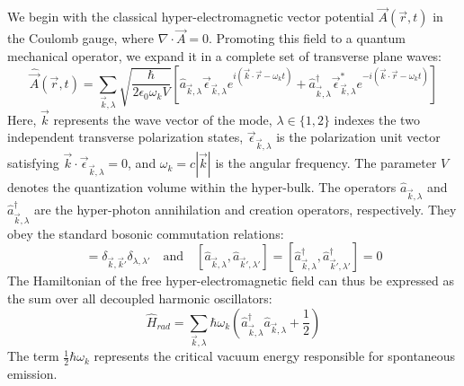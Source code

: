 We begin with the classical hyper-electromagnetic vector potential $\vec{A}(\vec{r}, t)$ in the Coulomb gauge, where $\nabla \cdot \vec{A} = 0$. Promoting this field to a quantum mechanical operator, we expand it in a complete set of transverse plane waves:
\begin{equation}
    \hat{\vec{A}}(\vec{r}, t) = \sum_{\vec{k}, \lambda} \sqrt{\frac{\hbar}{2 \epsilon_0 \omega_k V}} \left[ \hat{a}_{\vec{k}, \lambda} \vec{\epsilon}_{\vec{k}, \lambda} e^{i(\vec{k} \cdot \vec{r} - \omega_k t)} + \hat{a}_{\vec{k}, \lambda}^\dagger \vec{\epsilon}_{\vec{k}, \lambda}^* e^{-i(\vec{k} \cdot \vec{r} - \omega_k t)} \right]
\end{equation}
Here, $\vec{k}$ represents the wave vector of the mode, $\lambda \in \{1, 2\}$ indexes the two independent transverse polarization states, $\vec{\epsilon}_{\vec{k}, \lambda}$ is the polarization unit vector satisfying $\vec{k} \cdot \vec{\epsilon}_{\vec{k}, \lambda} = 0$, and $\omega_k = c|\vec{k}|$ is the angular frequency. The parameter $V$ denotes the quantization volume within the hyper-bulk. The operators $\hat{a}_{\vec{k}, \lambda}$ and $\hat{a}_{\vec{k}, \lambda}^\dagger$ are the hyper-photon annihilation and creation operators, respectively. They obey the standard bosonic commutation relations:
\begin{equation}
    [\hat{a}_{\vec{k}, \lambda}, \hat{a}_{\vec{k}', \lambda'}^\dagger] = \delta_{\vec{k}, \vec{k}'} \delta_{\lambda, \lambda'} \quad \text{and} \quad [\hat{a}_{\vec{k}, \lambda}, \hat{a}_{\vec{k}', \lambda'}] = [\hat{a}_{\vec{k}, \lambda}^\dagger, \hat{a}_{\vec{k}', \lambda'}^\dagger] = 0
\end{equation}
The Hamiltonian of the free hyper-electromagnetic field can thus be expressed as the sum over all decoupled harmonic oscillators:
\begin{equation}
    \hat{H}_{rad} = \sum_{\vec{k}, \lambda} \hbar \omega_k \left( \hat{a}_{\vec{k}, \lambda}^\dagger \hat{a}_{\vec{k}, \lambda} + \frac{1}{2} \right)
\end{equation}
The term $\frac{1}{2}\hbar\omega_k$ represents the critical vacuum energy responsible for spontaneous emission.

